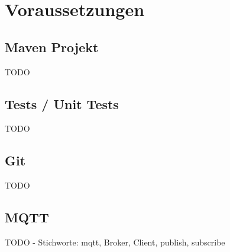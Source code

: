 \chapter{Voraussetzungen}
\section{Maven Projekt}
TODO
\section{Tests / Unit Tests}
TODO
\section{Git}
TODO
\section{MQTT}
\label{sec:mqtt}
TODO - Stichworte: \acrshort{mqtt}, Broker, Client, publish, subscribe
